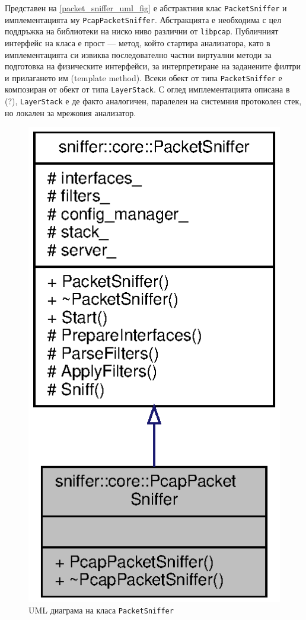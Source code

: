 \documentclass[12pt,a4paper,oneside]{book}
\begin{document}
Представен на \autoref{packet_sniffer_uml_fig} е абстрактния клас
\texttt{PacketSniffer} и имплементацията му \texttt{PcapPacketSniffer}.
Абстракцията е необходима с цел поддръжка на библиотеки на ниско ниво различни
от \texttt{libpcap}.  Публичният интерфейс на класа е прост --- метод, който
стартира анализатора, като в имплементацията си извиква последователно
частни виртуални методи за подготовка на физическите интерфейси, за
интерпретиране на заданените филтри и прилагането им (template method).
Всеки обект от типа \texttt{PacketSniffer} е композиран от обект от типа
\texttt{LayerStack}. С оглед имплементацията описана в (?),
\texttt{LayerStack} е де факто аналогичен, паралелен на системния протоколен
стек, но локален за мрежовия анализатор.

\begin{figure}[h!]
  \centering
  \includegraphics[scale=.7]{figures/packet_sniffer_uml.eps}
  \caption{UML диаграма на класа \texttt{PacketSniffer}}
  \label{packet_sniffer_uml_fig}
\end{figure}
\end{document}
